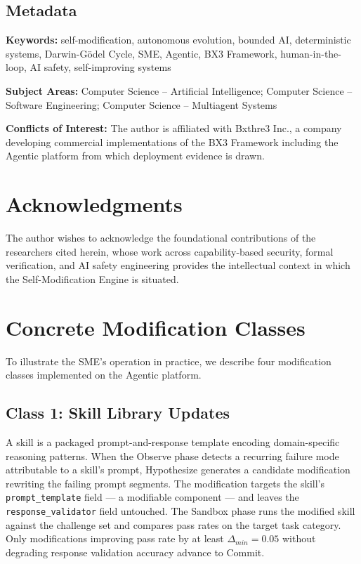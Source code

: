 \documentclass[12pt]{article}
\begin{document}
\subsection*{Metadata}

\textbf{Keywords:} self-modification, autonomous evolution, bounded AI, deterministic systems, Darwin-G\"odel Cycle, SME, Agentic, BX3 Framework, human-in-the-loop, AI safety, self-improving systems

\textbf{Subject Areas:} Computer Science -- Artificial Intelligence; Computer Science -- Software Engineering; Computer Science -- Multiagent Systems

\textbf{Conflicts of Interest:} The author is affiliated with Bxthre3 Inc., a company developing commercial implementations of the BX3 Framework including the Agentic platform from which deployment evidence is drawn.

\section*{Acknowledgments}

The author wishes to acknowledge the foundational contributions of the researchers cited herein, whose work across capability-based security, formal verification, and AI safety engineering provides the intellectual context in which the Self-Modification Engine is situated.


\section{Concrete Modification Classes}
\label{sec:mod-classes}

To illustrate the SME's operation in practice, we describe four modification classes implemented on the Agentic platform.

\subsection{Class 1: Skill Library Updates}
A skill is a packaged prompt-and-response template encoding domain-specific reasoning patterns. When the Observe phase detects a recurring failure mode attributable to a skill's prompt, Hypothesize generates a candidate modification rewriting the failing prompt segments. The modification targets the skill's \texttt{prompt\_template} field --- a modifiable component --- and leaves the \texttt{response\_validator} field untouched. The Sandbox phase runs the modified skill against the challenge set and compares pass rates on the target task category. Only modifications improving pass rate by at least $\Delta_{min} = 0.05$ without degrading response validation accuracy advance to Commit.
\end{document}
